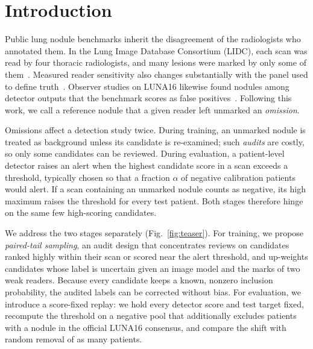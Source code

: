 \section{Introduction}
\label{sec:intro}

Public lung nodule benchmarks inherit the disagreement of the radiologists who annotated them. In the Lung Image Database Consortium (LIDC), each scan was read by four thoracic radiologists, and many lesions were marked by only some of them~\cite{armato2007variability,armato2011}. Measured reader sensitivity also changes substantially with the panel used to define truth~\cite{armato2009truth}. Observer studies on LUNA16 likewise found nodules among detector outputs that the benchmark scores as false positives~\cite{setio2017,jacobs2016cad}. Following this work, we call a reference nodule that a given reader left unmarked an \emph{omission}.

Omissions affect a detection study twice. During training, an unmarked nodule is treated as background unless its candidate is re-examined; such \emph{audits} are costly, so only some candidates can be reviewed. During evaluation, a patient-level detector raises an alert when the highest candidate score in a scan exceeds a threshold, typically chosen so that a fraction $\alpha$ of negative calibration patients would alert. If a scan containing an unmarked nodule counts as negative, its high maximum raises the threshold for every test patient. Both stages therefore hinge on the same few high-scoring candidates.

We address the two stages separately (Fig.~\ref{fig:teaser}). For training, we propose \emph{paired-tail sampling}, an audit design that concentrates reviews on candidates ranked highly within their scan or scored near the alert threshold, and up-weights candidates whose label is uncertain given an image model and the marks of two weak readers. Because every candidate keeps a known, nonzero inclusion probability, the audited labels can be corrected without bias. For evaluation, we introduce a score-fixed replay: we hold every detector score and test target fixed, recompute the threshold on a negative pool that additionally excludes patients with a nodule in the official LUNA16 consensus, and compare the shift with random removal of as many patients.

